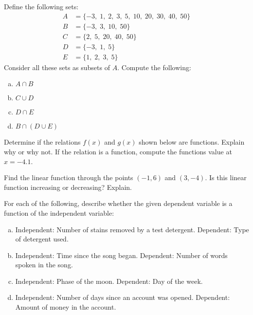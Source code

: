\documentclass[11pt,letterpaper]{article}
\begin{document}
\prob Define the following sets:
	\[
	\begin{aligned}
	A&= \{ -3,\; 1, \; 2,\; 3,\; 5,\; 10,\; 20,\; 30,\; 40,\; 50 \} \\
	B&= \{ -3,\; 3,\; 10,\; 50 \} \\
	C&= \{ 2,\; 5,\; 20,\; 40,\; 50 \} \\
	D&= \{ -3,\; 1,\; 5 \} \\
	E&= \{ 1,\; 2,\; 3,\; 5 \}
	\end{aligned}
	\]
Consider all these sets as subsets of $A$. Compute the following:
	\begin{enumerate}[(a)]
	\item $A \cap B$
	\item $C \cup D$
	\item $D \cap E$
	\item $B \cap (D \cup E)$
	\end{enumerate} \pspace


\prob Determine if the relations $f(x)$ and $g(x)$ shown below are functions. Explain why or why not. If the relation is a function, compute the functions value at $x= -4.1$.  \pspace


\prob Find the linear function through the points $(-1, 6)$ and $(3, -4)$. Is this linear function increasing or decreasing? Explain. \pspace


\prob For each of the following, describe whether the given dependent variable is a function of the independent variable:
	\begin{enumerate}[(a)]
	\item Independent: Number of stains removed by a test detergent. 
		Dependent: Type of detergent used. 
	\item Independent: Time since the song began.
		Dependent: Number of words spoken in the song. 
	\item Independent: Phase of the moon.
		Dependent: Day of the week. 
	\item Independent: Number of days since an account was opened. 
		Dependent: Amount of money in the account. 
	\end{enumerate} \pspace
\end{document}
